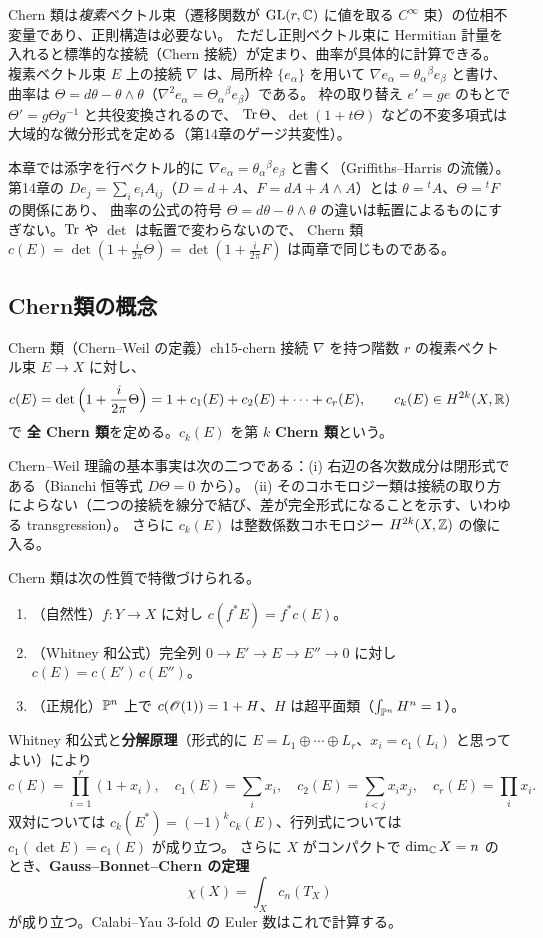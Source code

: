 Chern 類は\emph{複素}ベクトル束（遷移関数が $\operatorname{GL}(r,\mathbb{C})$ に値を取る $C^\infty$ 束）の位相不変量であり、正則構造は必要ない。
ただし正則ベクトル束に Hermitian 計量を入れると標準的な接続（Chern 接続）が定まり、曲率が具体的に計算できる。
複素ベクトル束 $E$ 上の接続 $\nabla$ は、局所枠 $\{e_\alpha\}$ を用いて $\nabla e_\alpha = \theta_\alpha{}^\beta e_\beta$ と書け、
曲率は $\Theta = d\theta - \theta\wedge\theta$（$\nabla^2 e_\alpha = \Theta_\alpha{}^\beta e_\beta$）である。
枠の取り替え $e' = g e$ のもとで $\Theta' = g\Theta g^{-1}$ と共役変換されるので、
$\operatorname{Tr}\Theta$、$\det(1+t\Theta)$ などの不変多項式は大域的な微分形式を定める（第14章のゲージ共変性）。
\begin{note}
本章では添字を行ベクトル的に $\nabla e_\alpha = \theta_\alpha{}^\beta e_\beta$ と書く（Griffiths--Harris の流儀）。
第14章の $De_j = \sum_i e_iA_{ij}$（$D = d+A$、$F = dA+A\wedge A$）とは $\theta = {}^tA$、$\Theta = {}^tF$ の関係にあり、
曲率の公式の符号 $\Theta = d\theta - \theta\wedge\theta$ の違いは転置によるものにすぎない。$\operatorname{Tr}$ や $\det$ は転置で変わらないので、
Chern 類 $c(E) = \det(1+\frac{i}{2\pi}\Theta) = \det(1+\frac{i}{2\pi}F)$ は両章で同じものである。
\end{note}

\subsection{Chern類の概念}

\begin{mydef}{Chern 類（Chern--Weil の定義）}{ch15-chern}
接続 $\nabla$ を持つ階数 $r$ の複素ベクトル束 $E\to X$ に対し、
\[
c(E) = \det\Big(1 + \frac{i}{2\pi}\Theta\Big) = 1 + c_1(E) + c_2(E) + \cdots + c_r(E),\qquad c_k(E)\in H^{2k}(X,\mathbb{R})
\]
で \textbf{全 Chern 類}を定める。$c_k(E)$ を第 $k$ \textbf{Chern 類}という。
\end{mydef}

Chern--Weil 理論の基本事実は次の二つである：(i) 右辺の各次数成分は閉形式である（Bianchi 恒等式 $D\Theta = 0$ から）。
(ii) そのコホモロジー類は接続の取り方によらない（二つの接続を線分で結び、差が完全形式になることを示す、いわゆる transgression）。
さらに $c_k(E)$ は整数係数コホモロジー $H^{2k}(X,\mathbb{Z})$ の像に入る。

Chern 類は次の性質で特徴づけられる。
\begin{enumerate}
\item（自然性）$f:Y\to X$ に対し $c(f^*E) = f^*c(E)$。
\item（Whitney 和公式）完全列 $0\to E'\to E\to E''\to 0$ に対し $c(E) = c(E')\,c(E'')$。
\item（正規化）$\mathbb{P}^n$ 上で $c(\mathscr{O}(1)) = 1 + H$、$H$ は超平面類（$\int_{\mathbb{P}^n}H^n = 1$）。
\end{enumerate}
Whitney 和公式と\textbf{分解原理}（形式的に $E = L_1\oplus\cdots\oplus L_r$、$x_i = c_1(L_i)$ と思ってよい）により
\[
c(E) = \prod_{i=1}^r(1+x_i),\quad c_1(E) = \sum_i x_i,\quad c_2(E) = \sum_{i<j}x_ix_j,\quad c_r(E) = \prod_i x_i .
\]
双対については $c_k(E^*) = (-1)^kc_k(E)$、行列式については $c_1(\det E) = c_1(E)$ が成り立つ。
さらに $X$ がコンパクトで $\dim_{\mathbb{C}} X = n$ のとき、\textbf{Gauss--Bonnet--Chern の定理}
\[
\chi(X) = \int_X c_n(T_X)
\]
が成り立つ。Calabi--Yau 3-fold の Euler 数はこれで計算する。

